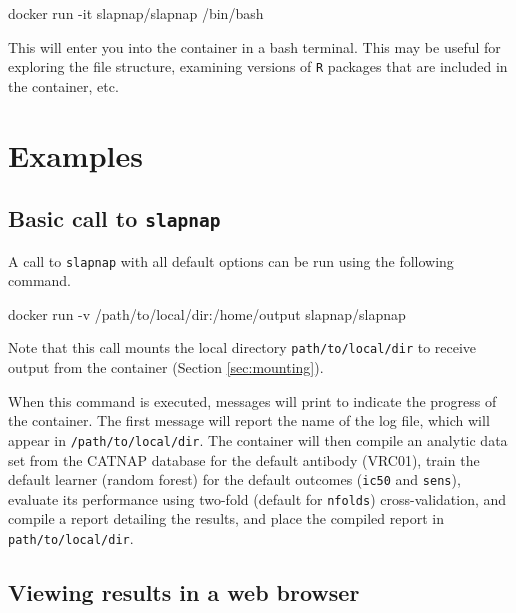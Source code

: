 \documentclass[]{article}
\newenvironment{Shaded}{\begin{snugshade}}{\end{snugshade}}
\newcommand{\ExtensionTok}[1]{#1}
\newcommand{\NormalTok}[1]{#1}
\begin{document}
\begin{Shaded}
\begin{Highlighting}[]
\ExtensionTok{docker}\NormalTok{ run -it slapnap/slapnap /bin/bash}
\end{Highlighting}
\end{Shaded}

This will enter you into the container in a bash terminal. This may be
useful for exploring the file structure, examining versions of
\texttt{R} packages that are included in the container, etc.

\section{Examples}\label{sec:examples}

\subsection{\texorpdfstring{Basic call to
\texttt{slapnap}}{Basic call to slapnap}}\label{basic-call-to-slapnap}

A call to \texttt{slapnap} with all default options can be run using the
following command.

\begin{Shaded}
\begin{Highlighting}[]
\ExtensionTok{docker}\NormalTok{ run -v /path/to/local/dir:/home/output slapnap/slapnap}
\end{Highlighting}
\end{Shaded}

Note that this call mounts the local directory
\texttt{path/to/local/dir} to receive output from the container (Section
\ref{sec:mounting}).

When this command is executed, messages will print to indicate the
progress of the container. The first message will report the name of the
log file, which will appear in \texttt{/path/to/local/dir}. The
container will then compile an analytic data set from the CATNAP
database for the default antibody (VRC01), train the default learner
(random forest) for the default outcomes (\texttt{ic50} and
\texttt{sens}), evaluate its performance using two-fold (default for
\texttt{nfolds}) cross-validation, and compile a report detailing the
results, and place the compiled report in \texttt{path/to/local/dir}.

\subsection{Viewing results in a web
browser}\label{viewing-results-in-a-web-browser}
\end{document}
